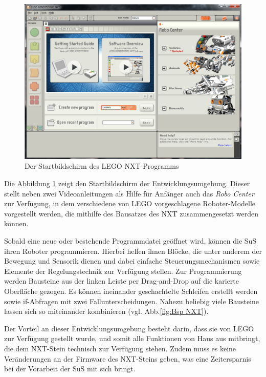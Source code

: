 \documentclass[paper=a4, DIV=calc, BCOR=12mm, twoside=on, onecolumn=on, open = right, titlepage =on, parskip =half-, headsepline = on, footsepline = off, chapterprefix = off, appendixprefix = on, fontsize = 12pt, numbers = noenddot, abstract = on]{scrbook}
\begin{document}
\begin{figure}[htb]
\centering
\includegraphics[width= \textwidth]{images/Startbildschirm_NXT.png} 
\caption[Der Startbildschirm des \textsc{LEGO} NXT-Programms]{Der Startbildschirm des \textsc{LEGO} NXT-\-Pro\-gramms}
\label{fig:NXT Start}
\end{figure}
Die Abbildung \ref{fig:NXT Start} zeigt den Startbildschirm der Entwicklungsumgebung. Dieser stellt neben zwei Videoanleitungen als Hilfe für Anfänger auch das \emph{Robo Center} zur Verfügung, in dem verschiedene von \textsc{LEGO} vorgeschlagene Roboter-Modelle vorgestellt werden, die mithilfe des Bausatzes des NXT zusammengesetzt werden können.

Sobald eine neue oder bestehende Programmdatei geöffnet wird, können die SuS ihren Roboter programmieren. Hierbei helfen ihnen Blöcke, die unter anderem der Bewegung und Sensorik dienen und dabei einfache Steuerungsmechanismen sowie Elemente der Regelungstechnik zur Verfügung stellen. Zur Programmierung werden Bausteine aus der linken Leiste per Drag-and-Drop auf die karierte Oberfläche gezogen. Es können ineinander geschachtelte Schleifen erstellt werden sowie if-Abfragen mit zwei Fallunterscheidungen. Nahezu beliebig viele Bausteine lassen sich so miteinander kombinieren (vgl. Abb.\ref{fig:Bsp NXT}).

Der Vorteil an dieser Entwicklungsumgebung besteht darin, dass sie von \textsc{LEGO} zur Verfügung gestellt wurde, und somit alle Funktionen von Haus aus mitbringt, die dem NXT-Stein technisch zur Verfügung stehen. Zudem muss es keine Veränderungen an der Firmware des NXT-Steins geben, was eine Zeitersparnis bei der Vorarbeit der SuS mit sich bringt.
\end{document}
